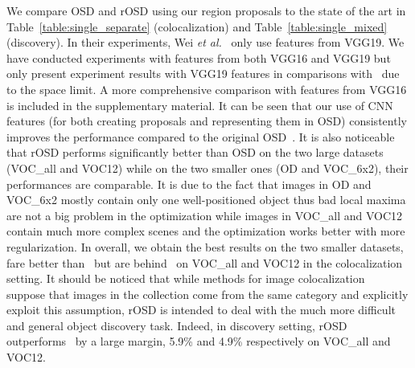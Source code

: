 \documentclass[runningheads]{llncs}
\begin{document}
We compare OSD and rOSD using our region proposals to the state of the art in Table~\ref{table:single_separate} (colocalization) and Table~\ref{table:single_mixed} (discovery). In their experiments, Wei {\em et al.}~\cite{Wei2019ddtplus} only use features from VGG19. We have conducted experiments with features from both VGG16 and VGG19 but only present experiment results with VGG19 features in comparisons with~\cite{Wei2019ddtplus} due to the space limit. A more comprehensive comparison with features from VGG16 is included in the supplementary material. It can be seen that our use of CNN features (for both creating proposals and representing them in OSD) consistently improves the performance compared to the original OSD~\cite{Vo2019UnsupOptim}. It is also noticeable that rOSD performs significantly better than OSD on the two large datasets (VOC\_all and VOC12) while on the two smaller ones (OD and VOC\_6x2), their performances are comparable. It is due to the fact that images in OD and VOC\_6x2 mostly contain only one well-positioned object thus bad local maxima are not a big problem in the optimization while images in VOC\_all and VOC12 contain much more complex scenes and the optimization works better with more regularization. In overall, we obtain the best results on the two smaller datasets, fare better than~\cite{Li2016mimick} but are behind~\cite{Wei2019ddtplus} on VOC\_all and VOC12 in the colocalization setting. It should be noticed that while methods for image colocalization~\cite{Li2016mimick,Wei2019ddtplus} suppose that images in the collection come from the same category and explicitly exploit this assumption, rOSD is intended to deal with the much more difficult and general object discovery task. Indeed, in discovery setting, rOSD outperforms~\cite{Wei2019ddtplus} by a large margin, 5.9\% and 4.9\% respectively on VOC\_all and VOC12.
\end{document}
